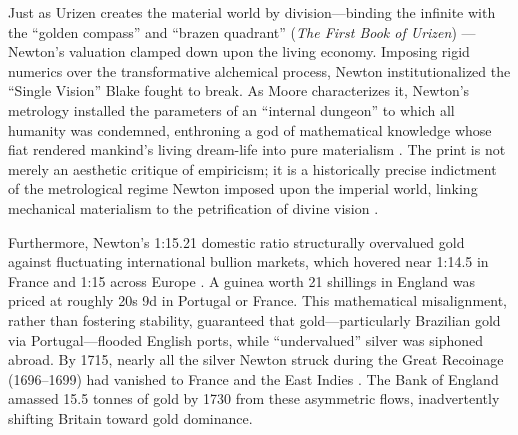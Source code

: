 \documentclass[
]{article}
\begin{document}
Just as Urizen creates the material world by division---binding the
infinite with the ``golden compass'' and ``brazen quadrant'' (\emph{The
First Book of Urizen}) \citep{blake1794urizen}---Newton's valuation
clamped down upon the living economy. Imposing rigid numerics over the
transformative alchemical process, Newton institutionalized the ``Single
Vision'' Blake fought to break. As Moore characterizes it, Newton's
metrology installed the parameters of an ``internal dungeon'' to which
all humanity was condemned, enthroning a god of mathematical knowledge
whose fiat rendered mankind's living dream-life into pure materialism
\citep{moore2014blake}. The print is not merely an aesthetic critique of
empiricism; it is a historically precise indictment of the metrological
regime Newton imposed upon the imperial world, linking mechanical
materialism to the petrification of divine vision
\citep{albernaz2024common, makdisi2003william}.

Furthermore, Newton's 1:15.21 domestic ratio structurally overvalued
gold against fluctuating international bullion markets, which hovered
near 1:14.5 in France and 1:15 across Europe \citep{quinn2007recoinage}.
A guinea worth 21 shillings in England was priced at roughly 20s 9d in
Portugal or France. This mathematical misalignment, rather than
fostering stability, guaranteed that gold---particularly Brazilian gold
via Portugal---flooded English ports, while ``undervalued'' silver was
siphoned abroad. By 1715, nearly all the silver Newton struck during the
Great Recoinage (1696--1699) had vanished to France and the East Indies
\citep{quinn1996competing}. The Bank of England amassed 15.5 tonnes of
gold by 1730 from these asymmetric flows, inadvertently shifting Britain
toward gold dominance.
\end{document}

